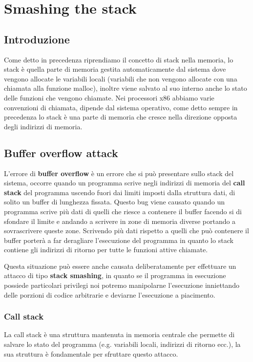 \chapter{Smashing the stack}

\section{Introduzione}
Come detto in precedenza riprendiamo il concetto di stack nella memoria, lo stack è quella parte di memoria gestita automaticamente dal sistema dove vengono allocate le variabili locali (variabili che non vengono allocate con una chiamata alla funzione malloc), inoltre viene salvato al suo interno anche lo stato delle funzioni che vengono chiamate.
Nei processori x86 abbiamo varie convenzioni di chiamata, dipende dal sistema operativo, come detto sempre in precedenza lo stack è una parte di memoria che cresce nella direzione opposta degli indirizzi di memoria.

\section{Buffer overflow attack}
L'errore di \textbf{buffer overflow} è un errore che si può presentare sullo stack del sistema, occorre quando un programma scrive negli indirizzi di memoria del \textbf{call stack} del programma uscendo fuori dai limiti imposti dalla struttura dati, di solito un buffer di lunghezza fissata.
Questo bug viene causato quando un programma scrive più dati di quelli che riesce a contenere il buffer facendo si di sfondare il limite e andando a scrivere in zone di memoria diverse portando a sovrascrivere queste zone.
Scrivendo più dati rispetto a quelli che può contenere il buffer porterà a far deragliare l'esecuzione del programma in quanto lo stack contiene gli indirizzi di ritorno per tutte le funzioni attive chiamate.

Questa situazione può essere anche causata deliberatamente per effettuare un attacco di tipo \textbf{stack smashing}, in quanto se il programma in esecuzione possiede particolari privilegi noi potremo manipolarne l'esecuzione inniettando delle porzioni di codice arbitrarie e deviarne l'esecuzione a piacimento.

\subsection{Call stack}
La call stack è una struttura mantenuta in memoria centrale che permette di salvare lo stato del programma (e.g. variabili locali, indirizzi di ritorno ecc.), la sua struttura è fondamentale per sfruttare questo attacco.


